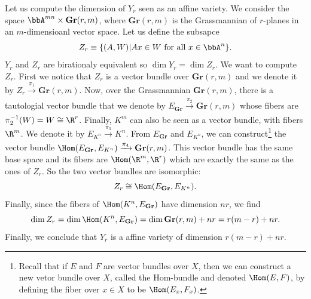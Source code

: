             Let us compute the dimension of $Y_r$ seen as an affine variety. We consider the space $\bbA^{mn}\times\textbf{Gr}(r,m)$, where $\textbf{Gr}(r,m)$ is the Grassmannian of $r$-planes in an $m$-dimensioanl vector space. Let us define the subsapce
            \begin{equation}
                Z_r\equiv\{(A,W)|Ax\in W\text{ for all } x\in\bbA^{n}\}.
            \end{equation}
            $Y_r$ and $Z_r$ are birationaly equivalent so $\dim Y_r=\dim Z_r$. We want to compute $Z_r$. First we notice that $Z_r$ is a vector bundle over $\textbf{Gr}(r,m)$ and we denote it by $Z_r\xrightarrow[]{\pi_1}\textbf{Gr}(r,m)$. Now, over the Grassmannian $\textbf{Gr}(r,m)$, there is a tautologial vector bundle that we denote by $E_{\textbf{Gr}}\xrightarrow[]{\pi_2}\textbf{Gr}(r,m)$ whose fibers are $\pi^{-1}_2(W)=W\cong\R^r$. Finally, $K^m$ can also be seen as a vector bundle, with fibers $\R^m$. We denote it by $E_{K^n}\xrightarrow[]{\pi_3}K^n$. From $E_{\textbf{Gr}}$ and $E_{K^n}$, we can construct\footnote{Recall that if $E$ and $F$ are vector bundles over $X$, then we can construct a new vetor bundle over $X$, called the Hom-bundle and denoted $\Hom(E,F)$, by defining the fiber over $x\in X$ to be $\Hom(E_x,F_x)$.} the vector bundle $\Hom(E_{\textbf{Gr}},E_{K^n})\xrightarrow[]{\pi_4}\textbf{Gr}(r,m)$. This vector bundle has the same base space and its fibers are $\Hom(\R^m,\R^r)$ which are exactly the same as the ones of $Z_r$. So the two vector bundles are isomorphic:
            \begin{equation}
                Z_r\cong\Hom(E_{\textbf{Gr}},E_{K^n}).
            \end{equation}
            Finally, since the fibers of $\Hom(K^n,E_{\textbf{Gr}})$ have dimension $nr$, we find
            \begin{equation}
                \dim Z_r = \dim\Hom(K^n,E_{\textbf{Gr}}) = \dim\textbf{Gr}(r,m)+nr = r(m-r)+nr.
            \end{equation}
            Finally, we conclude that $Y_r$ is a affine variety of dimension $r(m-r)+nr$.

